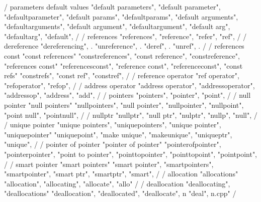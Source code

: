 {        / parameters default values 
        "default parameters",  
        "default parameter",  
        "defaultparameter",  
        "default params",  
        "defaultparams",  
        "default arguments",  
        "defaultarguments",  
        "default argument",  
        "defaultargument",  
        "default arg",  
        "defaultarg",  
        "default",  
        /
        / references 
        "references",  
        "reference",  
        "refer",  
        "ref",  
        /
        / dereference 
        "dereferencing", . 
        "unreference", . 
        "deref", . 
        "unref", . 
        /
        / references const 
        "const references"
        "constreferences",
        "const reference",
        "constreference", 
        "references const"
        "referencesconst",
        "reference const",
        "referenceconst", 
        "const refs"
        "constrefs",
        "const ref",
        "constref", 
        /
        / reference operator 
        "ref operator",
        "refoperator", 
        "refop",
        /
        / address operator 
        "address operator",  
        "addressoperator",  
        "addressop",  
        "address",  
        "add",  
        /
        / pointers
        "pointers",
        "pointer",
        "point",
        /
        / null pointer
        "null pointers"
        "nullpointers",
        "null pointer",
        "nullpointer", 
        "nullpoint",
        "point null",
        "pointnull", 
        /
        / nullptr
        "nullptr",
        "null ptr",
        "nulptr",
        "nullp",
        "null",
        /
        / unique pointer
        "unique pointers",
        "uniquepointers", 
        "unique pointer", 
        "uniquepointer"
        "uniquepoint", 
        "make unique", 
        "makeunique",
        "uniqueptr",
        "unique",
        /
        / pointer of pointer
        "pointer of pointer"
        "pointerofpointer", 
        "pointerpointer",
        "point to pointer", 
        "pointtopointer",
        "pointtopoint",
        "pointpoint",
        /
        / smart pointer
        "smart pointers"
        "smart pointer",
        "smartpointers",
        "smartpointer", 
        "smart ptr",
        "smartptr", 
        "smart",
        /
        / allocation 
        "allocations"
        "allocation",
        "allocating",
        "allocate",
        "allo"
        /
        / deallocation 
        "deallocating",
        "deallocations"
        "deallocation",
        "deallocated", 
        "deallocate", n
        "deal", n.cpp"}
        /
